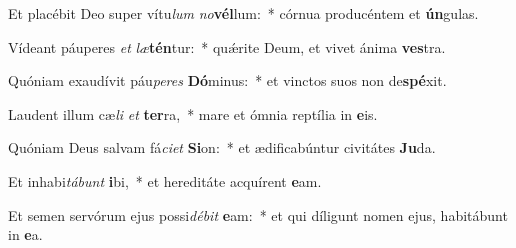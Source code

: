\item Et placébit Deo super vítu\textit{lum} \textit{no}\textbf{vél}lum:~* córnua producéntem et \textbf{ún}gulas.
\item Vídeant páuperes \textit{et} \textit{læ}\textbf{tén}tur:~* quǽrite Deum, et vivet ánima \textbf{ves}tra.
\item Quóniam exaudívit páu\textit{pe}\textit{res} \textbf{Dó}minus:~* et vinctos suos non de\textbf{spé}xit.
\item Laudent illum cæ\textit{li} \textit{et} \textbf{ter}ra,~* mare et ómnia reptília in \textbf{e}is.
\item Quóniam Deus salvam fá\textit{ci}\textit{et} \textbf{Si}on:~* et ædificabúntur civitátes \textbf{Ju}da.
\item Et inhabi\textit{tá}\textit{bunt} \textbf{i}bi,~* et hereditáte acquírent \textbf{e}am.
\item Et semen servórum ejus possi\textit{dé}\textit{bit} \textbf{e}am:~* et qui díligunt nomen ejus, habitábunt in \textbf{e}a.
